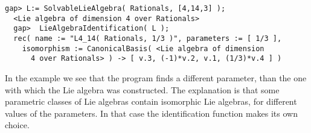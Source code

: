 \documentclass[a4paper,11pt]{report}
\begin{document}
{{{\begin{Verbatim}[fontsize=\small,frame=single,label=Example]
  gap> L:= SolvableLieAlgebra( Rationals, [4,14,3] );
  <Lie algebra of dimension 4 over Rationals>
  gap>  LieAlgebraIdentification( L );
  rec( name := "L4_14( Rationals, 1/3 )", parameters := [ 1/3 ],
    isomorphism := CanonicalBasis( <Lie algebra of dimension
      4 over Rationals> ) -> [ v.3, (-1)*v.2, v.1, (1/3)*v.4 ] )
\end{Verbatim}
 In the example we see that the program finds a different parameter, than the
one with which the Lie algebra was constructed. The explanation is that some
parametric classes of Lie algebras contain isomorphic Lie algebras, for
different values of the parameters. In that case the identification function
makes its own choice. }

 }

 }

 
\end{document}
